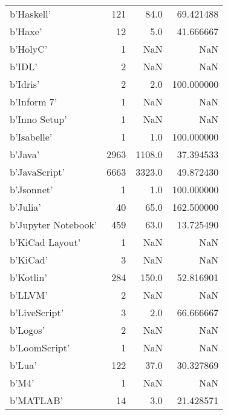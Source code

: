 \begin{table}
\begin{tabular}{lrrr}
b'Haskell'                  &             121 &      84.0 &      69.421488 \\
b'Haxe'                     &              12 &       5.0 &      41.666667 \\
b'HolyC'                    &               1 &       NaN &            NaN \\
b'IDL'                      &               2 &       NaN &            NaN \\
b'Idris'                    &               2 &       2.0 &     100.000000 \\
b'Inform 7'                 &               1 &       NaN &            NaN \\
b'Inno Setup'               &               1 &       NaN &            NaN \\
b'Isabelle'                 &               1 &       1.0 &     100.000000 \\
b'Java'                     &            2963 &    1108.0 &      37.394533 \\
b'JavaScript'               &            6663 &    3323.0 &      49.872430 \\
b'Jsonnet'                  &               1 &       1.0 &     100.000000 \\
b'Julia'                    &              40 &      65.0 &     162.500000 \\
b'Jupyter Notebook'         &             459 &      63.0 &      13.725490 \\
b'KiCad Layout'             &               1 &       NaN &            NaN \\
b'KiCad'                    &               3 &       NaN &            NaN \\
b'Kotlin'                   &             284 &     150.0 &      52.816901 \\
b'LLVM'                     &               2 &       NaN &            NaN \\
b'LiveScript'               &               3 &       2.0 &      66.666667 \\
b'Logos'                    &               2 &       NaN &            NaN \\
b'LoomScript'               &               1 &       NaN &            NaN \\
b'Lua'                      &             122 &      37.0 &      30.327869 \\
b'M4'                       &               1 &       NaN &            NaN \\
b'MATLAB'                   &              14 &       3.0 &      21.428571 \\

\end{tabular}
\end{table}
